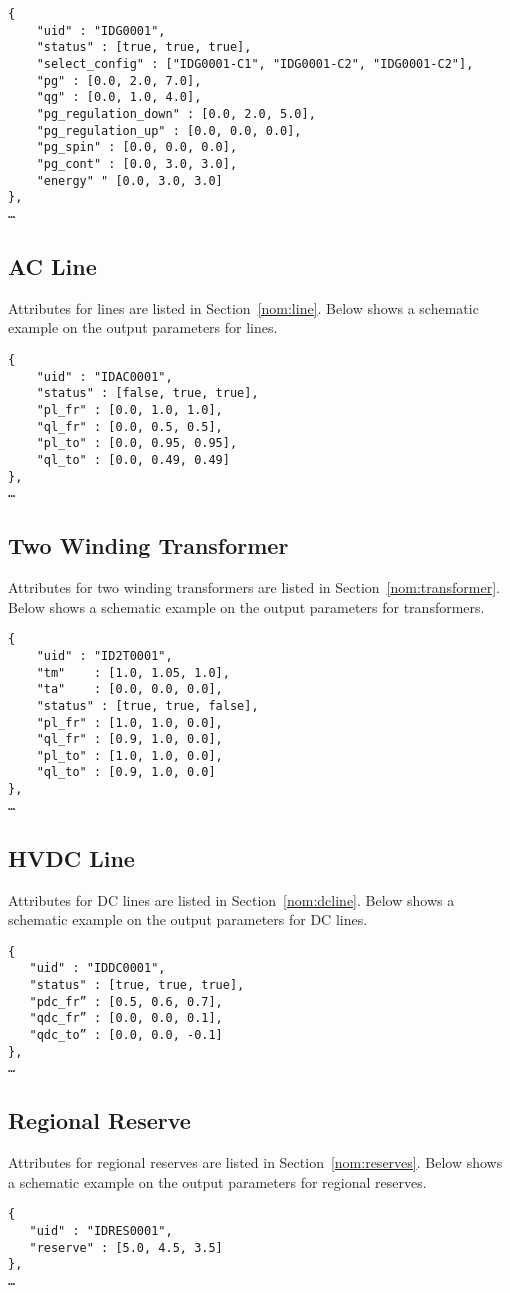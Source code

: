 \begin{verbatim}
{
    "uid" : "IDG0001",
    "status" : [true, true, true],
    "select_config" : ["IDG0001-C1", "IDG0001-C2", "IDG0001-C2"],
    "pg" : [0.0, 2.0, 7.0],
    "qg" : [0.0, 1.0, 4.0],
    "pg_regulation_down" : [0.0, 2.0, 5.0],
    "pg_regulation_up" : [0.0, 0.0, 0.0],
    "pg_spin" : [0.0, 0.0, 0.0],
    "pg_cont" : [0.0, 3.0, 3.0],
    "energy" " [0.0, 3.0, 3.0]        
},
…     
\end{verbatim}

\subsection{AC Line}
Attributes for lines are listed in Section~\ref{nom:line}.
Below shows a schematic example on the output parameters for lines.

\begin{verbatim}
{
    "uid" : "IDAC0001",
    "status" : [false, true, true],
    "pl_fr" : [0.0, 1.0, 1.0],
    "ql_fr" : [0.0, 0.5, 0.5],
    "pl_to" : [0.0, 0.95, 0.95],
    "ql_to" : [0.0, 0.49, 0.49]
},
…     
\end{verbatim}



\subsection{Two Winding Transformer}
Attributes for two winding transformers are listed in Section~\ref{nom:transformer}.
Below shows a schematic example on the output parameters for transformers.

\begin{verbatim}
{
    "uid" : "ID2T0001",
    "tm"    : [1.0, 1.05, 1.0],
    "ta"    : [0.0, 0.0, 0.0],
    "status" : [true, true, false],
    "pl_fr" : [1.0, 1.0, 0.0],
    "ql_fr" : [0.9, 1.0, 0.0],
    "pl_to" : [1.0, 1.0, 0.0],
    "ql_to" : [0.9, 1.0, 0.0]
},
…     
\end{verbatim}

\subsection{HVDC Line}
Attributes for DC lines are listed in Section~\ref{nom:dcline}.
Below shows a schematic example on the output parameters for DC lines.
\begin{verbatim}
{
   "uid" : "IDDC0001",
   "status" : [true, true, true],   
   "pdc_fr” : [0.5, 0.6, 0.7],
   "qdc_fr” : [0.0, 0.0, 0.1],
   "qdc_to” : [0.0, 0.0, -0.1]
},
…    
\end{verbatim}



\subsection{Regional Reserve}
Attributes for regional reserves are listed in Section~\ref{nom:reserves}.
Below shows a schematic example on the output parameters for regional reserves.
\begin{verbatim}
{
   "uid" : "IDRES0001",
   "reserve" : [5.0, 4.5, 3.5]   
},
…    
\end{verbatim}



